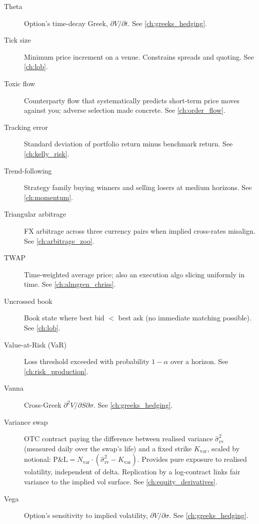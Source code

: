 \begin{description}
\item[Theta]
Option's time-decay Greek, $\partial V/\partial t$. See \cref{ch:greeks_hedging}.

\item[Tick size]
Minimum price increment on a venue. Constrains spreads and quoting. See \cref{ch:lob}.

\item[Toxic flow]
Counterparty flow that systematically predicts short-term price moves
against you; adverse selection made concrete. See \cref{ch:order_flow}.

\item[Tracking error]
Standard deviation of portfolio return minus benchmark return. See \cref{ch:kelly_risk}.

\item[Trend-following]
Strategy family buying winners and selling losers at medium horizons.
See \cref{ch:momentum}.

\item[Triangular arbitrage]
FX arbitrage across three currency pairs when implied cross-rates
misalign. See \cref{ch:arbitrage_zoo}.

\item[TWAP]
Time-weighted average price; also an execution algo slicing uniformly
in time. See \cref{ch:almgren_chriss}.

\item[Uncrossed book]
Book state where best bid $<$ best ask (no immediate matching
possible). See \cref{ch:lob}.

\item[Value-at-Risk (VaR)]
Loss threshold exceeded with probability $1-\alpha$ over a horizon. See \cref{ch:risk_production}.

\item[Vanna]
Cross-Greek $\partial^2 V/\partial S\partial\sigma$. See \cref{ch:greeks_hedging}.

\item[Variance swap]
OTC contract paying the difference between realised variance
$\hat{\sigma}^2_{\text{rv}}$ (measured daily over the swap's life)
and a fixed strike $K_{\text{var}}$, scaled by notional:
$\text{P\&L} = N_{\text{var}}\cdot(\hat\sigma^2_{\text{rv}} - K_{\text{var}})$.
Provides pure exposure to realised volatility, independent of delta.
Replication by a log-contract links fair variance to the implied vol
surface. See \cref{ch:equity_derivatives}.

\item[Vega]
Option's sensitivity to implied volatility, $\partial V/\partial
\sigma$. See \cref{ch:greeks_hedging}.


\end{description}
